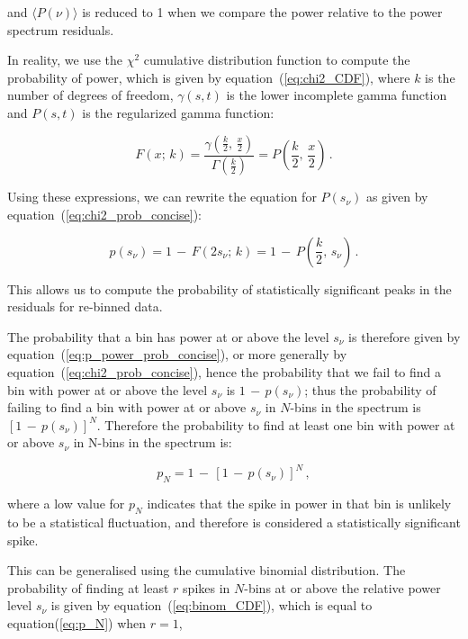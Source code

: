 and $\langle P(\nu) \rangle$ is reduced to 1 when we compare the power relative to the power spectrum residuals.

In reality, we use the $\chi^2$ cumulative distribution function to compute the probability of power, which is given by equation~(\ref{eq:chi2_CDF}), where $k$ is the number of degrees of freedom, $\gamma(s,t)$ is the lower incomplete gamma function and $P(s,t)$ is the regularized gamma function: 

\begin{equation}
F(x; \, k) = \frac{\gamma (\frac{k}{2}, \, \frac{x}{2})}{\Gamma(\frac{k}{2})} = P\left(\frac{k}{2}, \, \frac{x}{2}\right) \, .
\label{eq:chi2_CDF}
\end{equation}


Using these expressions, we can rewrite the equation for $P(s_{\nu})$ as given by equation~(\ref{eq:chi2_prob_concise}): 

\begin{equation}
p(s_{\nu}) = 1 \, - \, F(2s_{\nu}; \, k) =1 \, - \, P\left(\frac{k}{2}, \, s_{\nu}\right) \, .
\label{eq:chi2_prob_concise}
\end{equation}

This allows us to compute the probability of statistically significant peaks in the residuals for re-binned data.

The probability that a bin has power at or above the level $s_{\nu}$ is therefore given by equation~(\ref{eq:p_power_prob_concise}), or more generally by equation~(\ref{eq:chi2_prob_concise}), hence the probability that we fail to find a bin with power at or above the level $s_{\nu}$ is $1 \, - \, p(s_{\nu})$; thus the probability of failing to find a bin with power at or above $s_{\nu}$ in $N$-bins in the spectrum is $[1 \, - \, p(s_{\nu})]^N$. Therefore the probability to find at least one bin with power at or above $s_{\nu}$ in N-bins in the spectrum is:

\begin{equation}
p_N = 1\, - \, [1 \, - \, p(s_{\nu})]^N \, ,
\label{eq:p_N}
\end{equation}

where a low value for $p_N$ indicates that the spike in power in that bin is unlikely to be a statistical fluctuation, and therefore is considered a statistically significant spike.

This can be generalised using the cumulative binomial distribution. The probability of finding at least $r$ spikes in $N$-bins at or above the relative power level $s_{\nu}$ is given by equation~(\ref{eq:binom_CDF}), which is equal to equation(\ref{eq:p_N}) when $r=1$,

